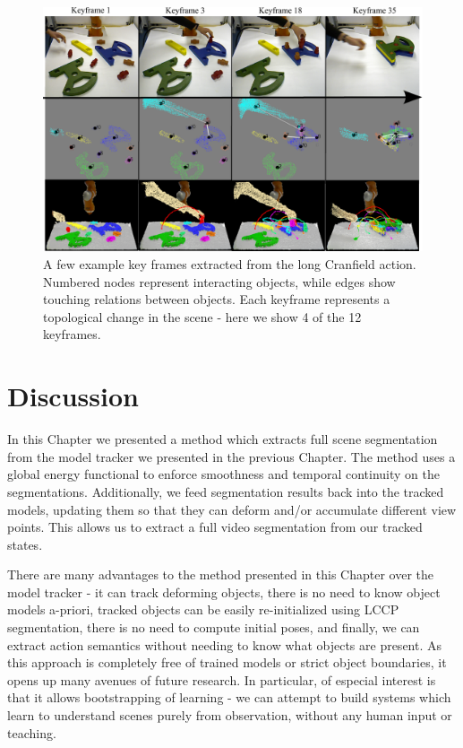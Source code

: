 \begin{figure}[ht!]
  \centering
  \includegraphics[width=\linewidth]{figures/IROS2013/SECKF.pdf}
  \caption[Cranfield Key Frames]{A few example key frames extracted from the long Cranfield action. Numbered nodes represent interacting objects, while edges show touching relations between objects. Each keyframe represents a topological change in the scene - here we show 4 of the 12 keyframes.}
  \label{fig:SECGraphs}
\end{figure}

\section{Discussion}
In this Chapter we presented a method which extracts full scene segmentation from the model tracker we presented in the previous Chapter. The method uses a global energy functional to enforce smoothness and temporal continuity on the segmentations. Additionally, we feed segmentation results back into the tracked models, updating them so that they can deform and/or accumulate different view points. This allows us to extract a full video segmentation from our tracked states.

There are many advantages to the method presented in this Chapter over the model tracker - it can track deforming objects, there is no need to know object models a-priori, tracked objects can be easily re-initialized using LCCP segmentation, there is no need to compute initial poses, and finally, we can extract action semantics without needing to know what objects are present. As this approach is completely free of trained models or strict object boundaries, it opens up many avenues of future research. In particular, of especial interest is that it allows bootstrapping of learning - we can attempt to build systems which learn to understand scenes purely from observation, without any human input or teaching.